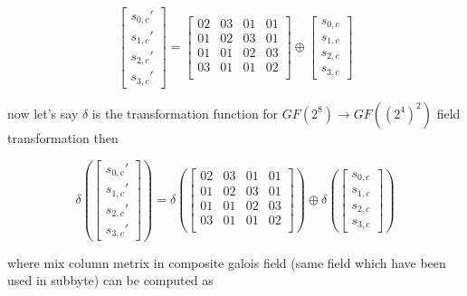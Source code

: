 \documentclass[10pt, conference, compsocconf]{IEEEtran}
\begin{document}
\begin{equation}
\left[ \begin{array}{c}
s_{0,c}' \\s_{1,c}' \\s_{2,c}' \\s_{3,c}' \end{array} \right] =
\left[ \begin{array}{cccccccc}
02 & 03 & 01 & 01\\
01 & 02 & 03 & 01\\
01 & 01 & 02 & 03\\
03 & 01 & 01 & 02\\
 \end{array} \right] \oplus
 \left[ \begin{array}{c}
s_{0,c}\\s_{1,c}\\s_{2,c}\\s_{3,c} \end{array} \right]
\end{equation}

now let's say $\delta$ is the transformation function for $GF(2^8) \rightarrow GF((2^4)^2)$ field transformation then

\begin{equation}
\delta \left(\left[ \begin{array}{c}
s_{0,c}' \\s_{1,c}' \\s_{2,c}' \\s_{3,c}' \end{array} \right]\right) =
\delta \left(\left[ \begin{array}{cccccccc}
02 & 03 & 01 & 01\\
01 & 02 & 03 & 01\\
01 & 01 & 02 & 03\\
03 & 01 & 01 & 02\\
 \end{array} \right]\right) \oplus
 \delta \left(\left[ \begin{array}{c}
s_{0,c}\\s_{1,c}\\s_{2,c}\\s_{3,c} \end{array} \right]\right)
\end{equation}

where mix column metrix in composite galois field (same field which have been used in subbyte) can be computed as
\end{document}
